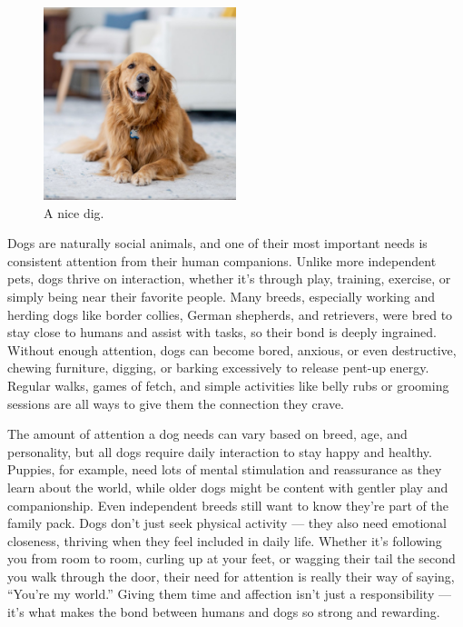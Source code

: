\documentclass[11pt,a4paper]{report}
\begin{document}
\begin{figure}[h]
    \centering
    \includegraphics[width=0.5\textwidth]{figs/Dog.png}
    \caption{A nice dig.}
    \label{fig:dog}
\end{figure}

Dogs are naturally social animals, and one of their most important needs is consistent attention from their human companions. Unlike more independent pets, dogs thrive on interaction, whether it’s through play, training, exercise, or simply being near their favorite people. Many breeds, especially working and herding dogs like border collies, German shepherds, and retrievers, were bred to stay close to humans and assist with tasks, so their bond is deeply ingrained. Without enough attention, dogs can become bored, anxious, or even destructive, chewing furniture, digging, or barking excessively to release pent-up energy. Regular walks, games of fetch, and simple activities like belly rubs or grooming sessions are all ways to give them the connection they crave.

The amount of attention a dog needs can vary based on breed, age, and personality, but all dogs require daily interaction to stay happy and healthy. Puppies, for example, need lots of mental stimulation and reassurance as they learn about the world, while older dogs might be content with gentler play and companionship. Even independent breeds still want to know they’re part of the family pack. Dogs don’t just seek physical activity — they also need emotional closeness, thriving when they feel included in daily life. Whether it’s following you from room to room, curling up at your feet, or wagging their tail the second you walk through the door, their need for attention is really their way of saying, “You’re my world.” Giving them time and affection isn’t just a responsibility — it’s what makes the bond between humans and dogs so strong and rewarding.
\end{document}
